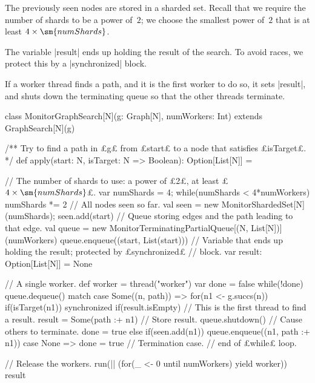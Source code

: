 \begin{answerI}
The previously seen nodes are stored in a sharded set.  Recall that we require
the number of shards to be a power of~$2$; we choose the smallest power of~$2$
that is at least $4 \times \sm{numShards}$.

The variable |result| ends up holding the result of the search.  To avoid
races, we protect this by a |synchronized| block. 

If a worker thread finds a path, and it is the first worker to do so, it sets
|result|, and shuts down the terminating queue so that the other threads
terminate.
%
\begin{scala}
class MonitorGraphSearch[N](g: Graph[N], numWorkers: Int) 
    extends GraphSearch[N](g){
  /** Try to find a path in £g£ from £start£ to a node that satisfies £isTarget£. */
  def apply(start: N, isTarget: N => Boolean): Option[List[N]] = {
    // The number of shards to use: a power of £2£, at least £$4 \times \sm{numShards}$£.
    var numShards = 4; while(numShards < 4*numWorkers) numShards *= 2
    // All nodes seen so far.
    val seen = new MonitorShardedSet[N](numShards); seen.add(start)
    // Queue storing edges and the path leading to that edge.
    val queue = new MonitorTerminatingPartialQueue[(N, List[N])](numWorkers)
    queue.enqueue((start, List(start)))    
    // Variable that ends up holding the result; protected by £synchronized£
    // block.
    var result: Option[List[N]] = None

    // A single worker.
    def worker = thread("worker"){
      var done = false
      while(!done) queue.dequeue() match{
        case Some((n, path)) =>
          for(n1 <- g.succs(n)){
            if(isTarget(n1)) synchronized{
              if(result.isEmpty){ // This is the first thread to find a result.
                result = Some(path :+ n1) // Store result.
                queue.shutdown() // Cause others to terminate.
                done = true
              }
            }
            else if(seen.add(n1)) queue.enqueue((n1, path :+ n1))
          } 
        case None => done = true // Termination case.
      } // end of £while£ loop.
    }

    // Release the workers. 
    run(|| (for(_ <- 0 until numWorkers) yield worker))
    result
  }
}
\end{scala}
\end{answerI}
